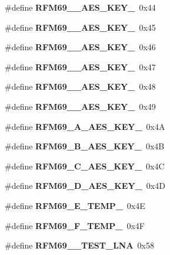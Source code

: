 \begin{DoxyCompactItemize}
\item 
\mbox{\label{_r_f_m69__registri_8h_ae1d342c62644e63a4f12f277b8fc226d}} 
\#define {\bfseries R\+F\+M69\+\_\+\_\+\+A\+E\+S\+\_\+\+K\+E\+Y\+\_}~0x44
\item 
\mbox{\label{_r_f_m69__registri_8h_ac04731753795898dc5b055da2db8eeeb}} 
\#define {\bfseries R\+F\+M69\+\_\+\_\+\+A\+E\+S\+\_\+\+K\+E\+Y\+\_}~0x45
\item 
\mbox{\label{_r_f_m69__registri_8h_a9e305672491497d12ffbe4be6098e6da}} 
\#define {\bfseries R\+F\+M69\+\_\+\_\+\+A\+E\+S\+\_\+\+K\+E\+Y\+\_}~0x46
\item 
\mbox{\label{_r_f_m69__registri_8h_a41f7e564aa0eb81f2b1eb857e4a0a085}} 
\#define {\bfseries R\+F\+M69\+\_\+\_\+\+A\+E\+S\+\_\+\+K\+E\+Y\+\_}~0x47
\item 
\mbox{\label{_r_f_m69__registri_8h_ab94bbfc5bb2ad62b88886a993a97e5fb}} 
\#define {\bfseries R\+F\+M69\+\_\+\_\+\+A\+E\+S\+\_\+\+K\+E\+Y\+\_}~0x48
\item 
\mbox{\label{_r_f_m69__registri_8h_aff4f800d8d13efc29deeb8c87166de1c}} 
\#define {\bfseries R\+F\+M69\+\_\+\_\+\+A\+E\+S\+\_\+\+K\+E\+Y\+\_}~0x49
\item 
\mbox{\label{_r_f_m69__registri_8h_ac0ad3e053d1f984eaf6182f922803107}} 
\#define {\bfseries R\+F\+M69\+\_\+A\+\_\+\+A\+E\+S\+\_\+\+K\+E\+Y\+\_}~0x4A
\item 
\mbox{\label{_r_f_m69__registri_8h_aee08018bbcb5de24ce8efe5de862ff2c}} 
\#define {\bfseries R\+F\+M69\+\_\+B\+\_\+\+A\+E\+S\+\_\+\+K\+E\+Y\+\_}~0x4B
\item 
\mbox{\label{_r_f_m69__registri_8h_a2fe4aae1d797a01c730a491c4deb04f6}} 
\#define {\bfseries R\+F\+M69\+\_\+C\+\_\+\+A\+E\+S\+\_\+\+K\+E\+Y\+\_}~0x4C
\item 
\mbox{\label{_r_f_m69__registri_8h_a194531e68de7908d228975c7535f296e}} 
\#define {\bfseries R\+F\+M69\+\_\+D\+\_\+\+A\+E\+S\+\_\+\+K\+E\+Y\+\_}~0x4D
\item 
\mbox{\label{_r_f_m69__registri_8h_a4156a3da13e2d6e056c739a616ce1a14}} 
\#define {\bfseries R\+F\+M69\+\_\+E\+\_\+\+T\+E\+M\+P\+\_}~0x4E
\item 
\mbox{\label{_r_f_m69__registri_8h_abbde30c871a397c94115c48d2ea81866}} 
\#define {\bfseries R\+F\+M69\+\_\+F\+\_\+\+T\+E\+M\+P\+\_}~0x4F
\item 
\mbox{\label{_r_f_m69__registri_8h_a87857b63767c7fdbcd3f8159f340544e}} 
\#define {\bfseries R\+F\+M69\+\_\+\_\+\+T\+E\+S\+T\+\_\+\+L\+NA}~0x58
\item 

\end{DoxyCompactItemize}
